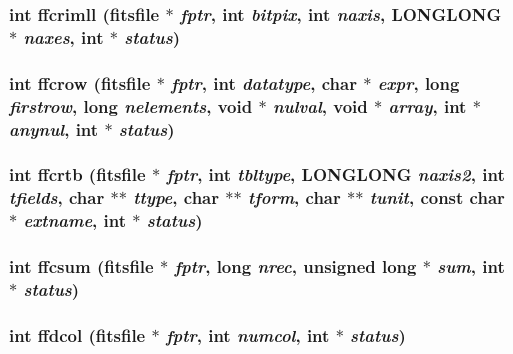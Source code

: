 \subsubsection{\setlength{\rightskip}{0pt plus 5cm}int ffcrimll (\bf{fitsfile} $\ast$ {\em fptr}, int {\em bitpix}, int {\em naxis}, \bf{LONGLONG} $\ast$ {\em naxes}, int $\ast$ {\em status})}\label{fitsio__64_8h_1f63a696ea6ed4ca47c04c67264d23e3}


\subsubsection{\setlength{\rightskip}{0pt plus 5cm}int ffcrow (\bf{fitsfile} $\ast$ {\em fptr}, int {\em datatype}, char $\ast$ {\em expr}, long {\em firstrow}, long {\em nelements}, void $\ast$ {\em nulval}, void $\ast$ {\em array}, int $\ast$ {\em anynul}, int $\ast$ {\em status})}\label{fitsio__64_8h_7460392e7c0487148565dc632faae6f9}


\subsubsection{\setlength{\rightskip}{0pt plus 5cm}int ffcrtb (\bf{fitsfile} $\ast$ {\em fptr}, int {\em tbltype}, \bf{LONGLONG} {\em naxis2}, int {\em tfields}, char $\ast$$\ast$ {\em ttype}, char $\ast$$\ast$ {\em tform}, char $\ast$$\ast$ {\em tunit}, const char $\ast$ {\em extname}, int $\ast$ {\em status})}\label{fitsio__64_8h_9e0996d3514ac3a9395ffe53f47ae47c}


\subsubsection{\setlength{\rightskip}{0pt plus 5cm}int ffcsum (\bf{fitsfile} $\ast$ {\em fptr}, long {\em nrec}, unsigned long $\ast$ {\em sum}, int $\ast$ {\em status})}\label{fitsio__64_8h_ed833bcd8507fea7a754cf607a386837}


\subsubsection{\setlength{\rightskip}{0pt plus 5cm}int ffdcol (\bf{fitsfile} $\ast$ {\em fptr}, int {\em numcol}, int $\ast$ {\em status})}\label{fitsio__64_8h_1ff2796da87658614b59e50b787208ad}


